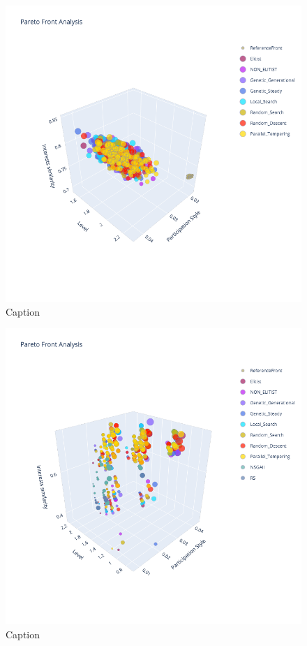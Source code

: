 \begin{figure}
    \centering
    \includegraphics[width=\textwidth]{images/3d_front_mixed_200_soa.png}
    \caption{Caption}
    \label{fig:my_label}
\end{figure}

\begin{figure}
    \centering
    \includegraphics[width=\textwidth]{images/3d_front_mized_20_moa_alt.png}
    \caption{Caption}
    \label{fig:my_label}
\end{figure}

